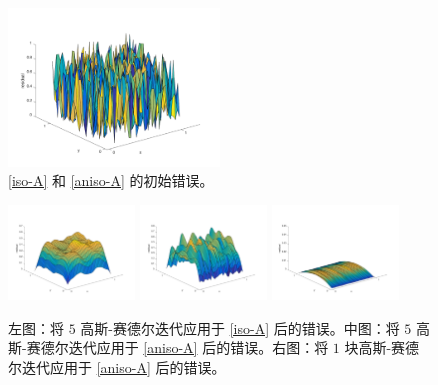 \documentclass[12pt]{acta_2011xz}
\begin{document}
   \begin{figure}[!htb]
    \centering
    \includegraphics[width=0.5\textwidth]{figures/isotropic_initial}
    \caption{   \eqref{iso-A}    和    \eqref{aniso-A}    的初始错误。  }
    \label{random-exact}
\end{figure}     

   \begin{figure}[!htb]
    \centering
    \includegraphics[width=0.3\textwidth]{figures/isotropic_smoothed}
    \includegraphics[width=0.3\textwidth]{figures/anisotropic_smoothed}
    \includegraphics[width=0.3\textwidth]{figures/anisotropic_blk}
    \caption{左图：将    $5$    高斯-赛德尔迭代应用于    \eqref{iso-A}    后的错误。中图：将    $5$    高斯-赛德尔迭代应用于    \eqref{aniso-A}    后的错误。右图：将    $1$    块高斯-赛德尔迭代应用于    \eqref{aniso-A}    后的错误。  }
    \label{f:anisotropic}
\end{figure}     


 
 
 
 
\end{document}
